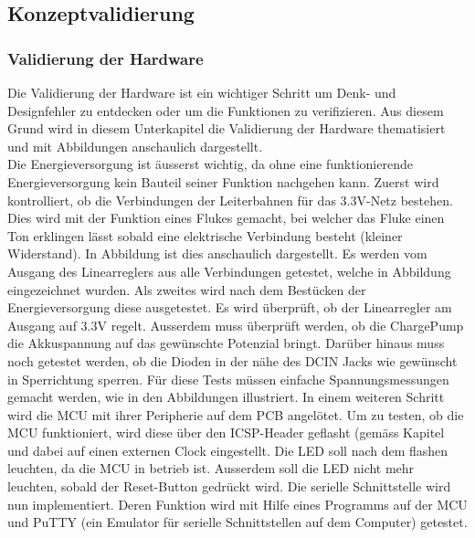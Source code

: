 \subsection{Konzeptvalidierung}
\label{subsec:Konzeptvalidierung}

\subsubsection{Validierung der Hardware}
Die Validierung der Hardware ist ein wichtiger Schritt um Denk- und Designfehler zu entdecken oder um die Funktionen zu verifizieren. Aus diesem Grund wird in diesem Unterkapitel die Validierung der Hardware thematisiert und mit Abbildungen anschaulich dargestellt.\\

Die Energieversorgung ist äusserst wichtig, da ohne eine funktionierende Energieversorgung kein Bauteil seiner Funktion nachgehen kann. Zuerst wird kontrolliert, ob die Verbindungen der Leiterbahnen für das 3.3V-Netz bestehen. Dies wird mit der Funktion eines Flukes gemacht, bei welcher das Fluke einen Ton erklingen lässt sobald eine elektrische Verbindung besteht (kleiner Widerstand). In Abbildung  ist dies anschaulich dargestellt. Es werden vom Ausgang des Linearreglers aus alle Verbindungen getestet, welche in Abbildung  eingezeichnet wurden.
Als zweites wird nach dem Bestücken der Energieversorgung diese ausgetestet. Es wird überprüft, ob der Linearregler am Ausgang auf 3.3V regelt. Ausserdem muss überprüft werden, ob die ChargePump die Akkuspannung auf das gewünschte Potenzial bringt. Darüber hinaus muss noch getestet werden, ob die Dioden in der nähe des DCIN Jacks wie gewünscht in Sperrichtung sperren. Für diese Tests müssen einfache Spannungsmessungen gemacht werden, wie in den Abbildungen  illustriert.
In einem weiteren Schritt wird die MCU mit ihrer Peripherie auf dem PCB angelötet. Um zu testen, ob die MCU funktioniert, wird diese über den ICSP-Header geflasht (gemäss Kapitel  und dabei auf einen externen Clock eingestellt. Die LED soll nach dem flashen leuchten, da die MCU in betrieb ist. Ausserdem soll die LED nicht mehr leuchten, sobald der Reset-Button gedrückt wird.
Die serielle Schnittstelle wird nun implementiert. Deren Funktion wird mit Hilfe eines Programms auf der MCU und PuTTY (ein Emulator für serielle Schnittstellen auf dem Computer) getestet.
